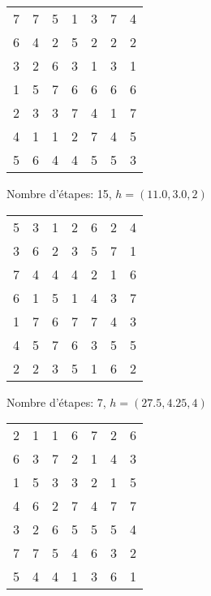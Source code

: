 \documentclass[a4paper, 10pt]{article}
\newcommand{\bb}[1]{\colorbox{blue!30}{#1}}
\begin{document}
\begin{figure}[h]
\centering
\begin{subfigure}[h]{0.45\textwidth}
	\centering
	\begin{tabular}{|c c c c c c c|}
		\hline
		7 & 7 & \bb{5} & \bb{1} & \bb{3} & \bb{7} & 4 \\
		\bb{6} & \bb{4} & 2 & 5 & 2 & 2 & \bb{2} \\
		3 & 2 & 6 & 3 & 1 & 3 & 1 \\
		1 & 5 & 7 & 6 & 6 & 6 & 6 \\
		2 & 3 & 3 & 7 & 4 & 1 & 7 \\
		4 & 1 & 1 & 2 & 7 & 4 & 5 \\
		5 & 6 & 4 & 4 & 5 & 5 & 3 \\
		\hline
	\end{tabular}
	\caption{Nombre d'étapes: 15, $h = (11.0, 3.0, 2)$}
\end{subfigure}
\begin{subfigure}[h]{0.45\textwidth}
	\centering
	\begin{tabular}{|c c c c c c c|}
		\hline
		\bb{5} & \bb{3} & \bb{1} & \bb{2} & \bb{6} & 2 & \bb{4} \\
		3 & 6 & 2 & 3 & 5 & \bb{7} & 1 \\
		7 & 4 & 4 & 4 & 2 & 1 & 6 \\
		6 & 1 & 5 & 1 & 4 & 3 & 7 \\
		1 & 7 & 6 & 7 & 7 & 4 & 3 \\
		4 & 5 & 7 & 6 & 3 & 5 & 5 \\
		2 & 2 & 3 & 5 & 1 & 6 & 2 \\
		\hline
	\end{tabular}
	\caption{Nombre d'étapes: 7, $h = (27.5, 4.25, 4)$}
\end{subfigure}
\begin{subfigure}[h]{0.45\textwidth}
	\centering
	\begin{tabular}{|c c c c c c c|}
		\hline
		\bb{2} & 1 & 1 & \bb{6} & 7 & 2 & 6 \\
		6 & \bb{3} & \bb{7} & 2 & \bb{1} & \bb{4} & 3 \\
		1 & 5 & 3 & 3 & 2 & 1 & \bb{5} \\
		4 & 6 & 2 & 7 & 4 & 7 & 7 \\
		3 & 2 & 6 & 5 & 5 & 5 & 4 \\
		7 & 7 & 5 & 4 & 6 & 3 & 2 \\
		5 & 4 & 4 & 1 & 3 & 6 & 1 \\

\end{tabular}
\end{subfigure}
\end{figure}
\end{document}
